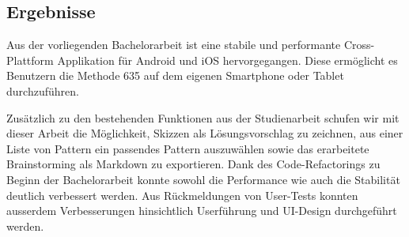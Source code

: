 \subsection{Ergebnisse}
Aus der vorliegenden Bachelorarbeit ist eine stabile und performante Cross-Plattform Applikation für Android und iOS hervorgegangen. Diese ermöglicht es Benutzern die Methode 635 auf dem eigenen Smartphone oder Tablet durchzuführen.

Zusätzlich zu den bestehenden Funktionen aus der Studienarbeit schufen wir mit dieser Arbeit die Möglichkeit, Skizzen als Lösungsvorschlag zu zeichnen, aus einer Liste von Pattern ein passendes Pattern auszuwählen sowie das erarbeitete Brainstorming als Markdown zu exportieren. Dank des Code-Refactorings zu Beginn der Bachelorarbeit konnte sowohl die Performance wie auch die Stabilität deutlich verbessert werden. Aus Rückmeldungen von User-Tests konnten ausserdem Verbesserungen hinsichtlich Userführung und UI-Design durchgeführt werden.